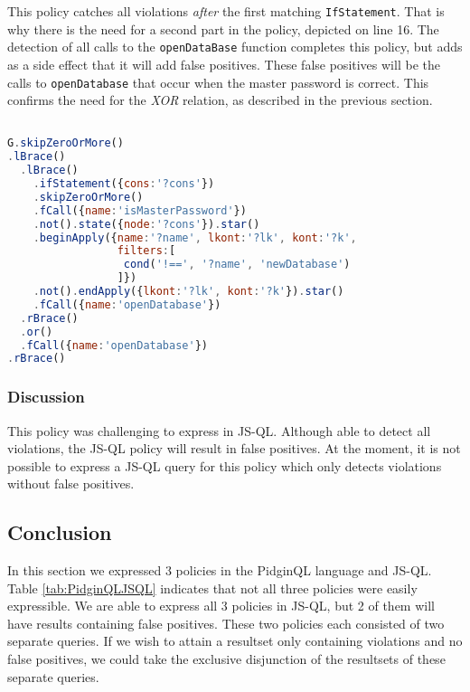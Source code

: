This policy catches all violations \textit{after} the first matching \texttt{IfStatement}. That is why there is the need for a second part in the policy, depicted on line 16. The detection of all calls to the \texttt{openDataBase} function completes this policy, but adds as a side effect that it will add false positives. These false positives will be the calls to \texttt{openDatabase} that occur when the master password is correct. This confirms the need for the \textit{XOR} relation, as described in the previous section. 

\begin{lstlisting}[label={lst:Policy6JSQL},language=JavaScript,caption=Policy 6 in JS-QL,mathescape=true]  % float=t?

G.skipZeroOrMore()
.lBrace()
  .lBrace()
    .ifStatement({cons:'?cons'})
    .skipZeroOrMore()
    .fCall({name:'isMasterPassword'})
    .not().state({node:'?cons'}).star()
    .beginApply({name:'?name', lkont:'?lk', kont:'?k',
                 filters:[
                  cond('!==', '?name', 'newDatabase')
                 ]})
    .not().endApply({lkont:'?lk', kont:'?k'}).star()
    .fCall({name:'openDatabase'})
  .rBrace()
  .or()
  .fCall({name:'openDatabase'})
.rBrace()
\end{lstlisting}

\subsubsection*{Discussion}
This policy was challenging to express in JS-QL. Although able to detect all violations, the JS-QL policy will result in false positives. At the moment, it is not possible to express a JS-QL query for this policy which only detects violations without false positives.

\subsection{Conclusion}
In this section we expressed 3 policies in the PidginQL language and JS-QL. Table \ref{tab:PidginQLJSQL} indicates that not all three policies were easily expressible. We are able to express all 3 policies in JS-QL, but 2 of them will have results containing false positives. These two policies each consisted of two separate queries. If we wish to attain a resultset only containing violations and no false positives, we could take the exclusive disjunction of the resultsets of these separate queries. 

